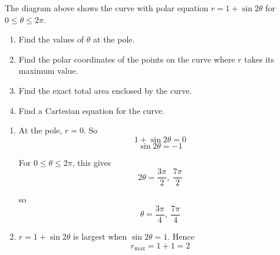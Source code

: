 \documentclass[leqno]{article}
\begin{document}
\djsFrontMatter
	\begin{enumerate}[
	  label=\textbf{\arabic*.},
	  leftmargin=*,
	  topsep=0pt,
	  partopsep=0pt,
	  parsep=0pt
	]
	
\questionitem

\begin{figure}[H]
    \centering
{}
\end{figure}


The diagram above shows the curve with polar equation $r=1+\sin 2\theta$ for $0\leq\theta\leq2\pi$. \\
\begin{enumerate}[label=\textbf{(\alph*)}]
  \item Find the values of $\theta$ at the pole.  \\
  \item Find the polar coordinates of the points on the curve where $r$ takes its maximum value.  \\
  \item Find the exact total area enclosed by the curve.  \\
  \item Find a Cartesian equation for the curve.  \\
\end{enumerate}

\vspace*{10pt}
	
\begin{djsSolution}
\begin{enumerate}[label=\textbf{(\alph*)}]
	  \item At the pole, \(r=0\). So
	  \[
	  1+\sin 2\theta=0
	  \]
	  \[
	  \sin 2\theta=-1
	  \]

	  For \(0\leq \theta \leq 2\pi\), this gives
	  \[
	  2\theta=\frac{3\pi}{2},\ \frac{7\pi}{2}
	  \]

	  so
	  \[
	  \theta=\frac{3\pi}{4},\ \frac{7\pi}{4}
	  \]
	
	  \item \(r=1+\sin 2\theta\) is largest when \(\sin 2\theta=1\). Hence
	  \[
	  r_{\max}=1+1=2
	  \]


\end{enumerate}
\end{djsSolution}
\end{enumerate}
\end{document}

